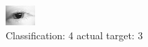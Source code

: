 \begin{figure}[h!]
\begin{center}
\includegraphics[width=0.60\columnwidth]{figures/ID14_class_4_target_3.png}
\end{center}
\caption{ Classification: 4 actual target: 3}
\label{fig:ID14_class_4_target_3}
\end{figure}
